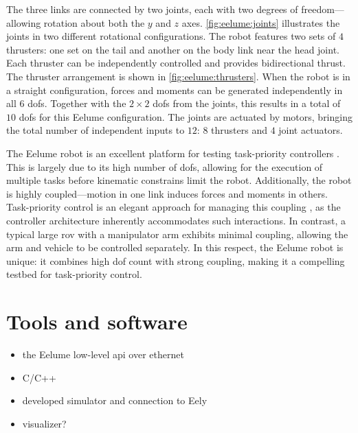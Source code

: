 The three links are connected by two joints, each with two degrees of freedom—
allowing rotation about both the $y$ and $z$ axes. \autoref{fig:eelume:joints} 
illustrates the joints in two different rotational configurations. The robot 
features two sets of $4$ thrusters: one set on the tail and another on the 
body link near the head joint. Each thruster can be independently controlled 
and provides bidirectional thrust. The thruster arrangement is shown in
\autoref{fig:eelume:thrusters}. When the robot is in a straight configuration, 
forces and moments can be generated independently in all $6$ \gls{dof}s. 
Together with the $2 \times 2$ \gls{dof}s from the joints, this results in a 
total of $10$ \gls{dof}s for this Eelume configuration. The joints are 
actuated by motors, bringing the total number of independent inputs to $12$:
$8$ thrusters and $4$ joint actuators.

The Eelume robot is an excellent platform for testing task-priority controllers
. This is largely due to its high number of \gls{dof}s, allowing for the 
execution of multiple tasks before kinematic constrains limit the robot. Additionally, 
the robot is highly coupled—motion in one link induces forces and moments in 
others. Task-priority control is an elegant approach for managing this coupling
, as the controller architecture inherently accommodates such interactions. In 
contrast, a typical large \gls{rov} with a manipulator arm exhibits minimal 
coupling, allowing the arm and vehicle to be controlled separately. In this 
respect, the Eelume robot is unique: it combines high \gls{dof} count with 
strong coupling, making it a compelling testbed for task-priority control.

\section{Tools and software}
\begin{itemize}
    \item the Eelume low-level api over ethernet
    \item C/C++
    \item developed simulator and connection to Eely
    \item visualizer?
\end{itemize}

